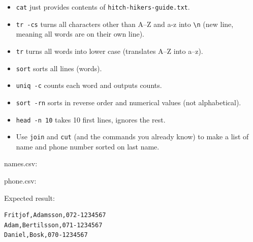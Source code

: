 \begin{frame}
  \begin{solution}
    \begin{itemize}
      \item \lstinline{cat} just provides contents of 
        \lstinline{hitch-hikers-guide.txt}.
      \item \lstinline{tr -cs} turns all characters other than A--Z and a-z 
        into \lstinline{\n} (new line, meaning all words are on their own 
        line).
      \item \lstinline{tr} turns all words into lower case (translates A--Z 
        into a--z).
      \item \lstinline{sort} sorts all lines (words).
      \item \lstinline{uniq -c} counts each word and outputs counts.
      \item \lstinline{sort -rn} sorts in reverse order and numerical values 
        (not alphabetical).
      \item \lstinline{head -n 10} takes 10 first lines, ignores the rest.
    \end{itemize}
  \end{solution}
\end{frame}

\begin{frame}[fragile]
  \begin{exercise}
    \begin{itemize}
      \item Use \lstinline{join} and \lstinline{cut} (and the commands you 
        already know) to make a list of name and phone number sorted on last 
        name.
    \end{itemize}
    names.csv: 

    phone.csv: 

    \pause

    Expected result:
    \begin{lstlisting}[numbers=none]
Fritjof,Adamsson,072-1234567
Adam,Bertilsson,071-1234567
Daniel,Bosk,070-1234567
    \end{lstlisting}
  \end{exercise}
\end{frame}

\begin{frame}[fragile]
  \begin{solution}
    
  \end{solution}
\end{frame}



